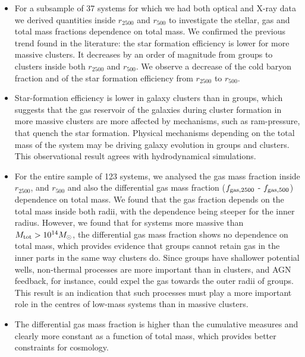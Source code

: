 \documentclass{aa}
\begin{document}
\begin{itemize}

\item{For a subsample of 37 systems for which we had both optical and
    X-ray data we derived quantities inside $r_{2500}$ and $r_{500}$ 
     to investigate the stellar, gas and total mass fractions dependence on total mass. 
     We confirmed the previous trend found in the literature: the
    star formation efficiency is lower for more massive clusters.
    It decreases by an order of magnitude from groups to clusters
    inside both  $r_{2500}$ and $r_{500}$. We observe a decrease of the cold baryon 
    fraction and of the star formation efficiency
    from $r_{2500}$ to $r_{500}$.}
    
    
\item{Star-formation efficiency is lower in galaxy clusters
      than in groups, which suggests that the gas reservoir of the galaxies during cluster formation 
      in more massive clusters are more affected by mechanisms, such as ram-pressure, that quench the star formation.
   Physical mechanisms depending on the total mass of the system may be driving galaxy evolution in groups and
      clusters. This observational result agrees with
      hydrodynamical simulations.}

\item{For the entire sample of 123 systems, we analysed the
       gas mass fraction inside $r_{2500}$, and $r_{500}$
      and also the differential gas mass fraction ($f_{\rm gas, 2500}$
      - $f_{\rm gas, 500}$) dependence on  total mass.  We found that the gas fraction depends
      on the total mass inside both radii, with the dependence being
      steeper for the inner radius. However, we found that for systems more massive than
      $M_{\rm tot} > 10^{14} M_{\odot}$, the differential gas mass fraction shows no 
      dependence on total mass, which provides evidence
      that groups cannot retain gas in the inner parts in the same way
      clusters do.  Since groups have shallower potential wells,
      non-thermal processes are more important than in clusters, and
      AGN feedback, for instance, could expel the gas towards the
      outer radii of groups. This result is an indication that such
      processes must play a more important role in the centres of low-mass
      systems than in massive clusters.}

\item{The differential gas mass fraction is higher than the
      cumulative measures and clearly more constant as a function of total mass, which provides better
      constraints for cosmology.}
  

\end{itemize}
\end{document}
